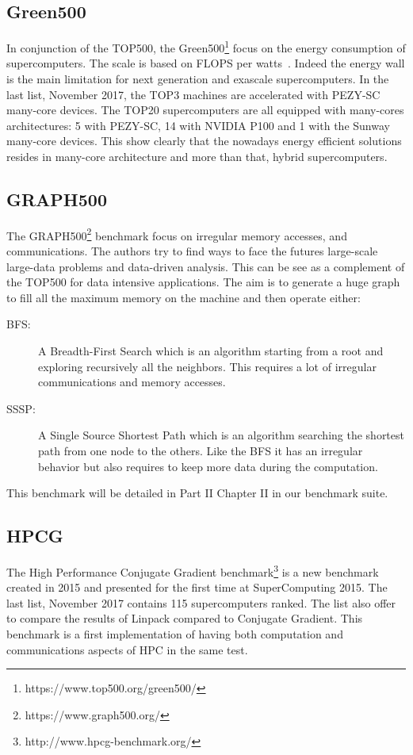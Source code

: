 \subsection{Green500}
In conjunction of the TOP500, the Green500\footnote{https://www.top500.org/green500/} focus on the energy consumption of supercomputers. 
The scale is based on FLOPS per watts~\cite{feng2007green500}.
Indeed the energy wall is the main limitation for next generation and exascale supercomputers. 
In the last list, November 2017, the TOP3 machines are accelerated with PEZY-SC many-core devices. 
The TOP20 supercomputers are all equipped with many-cores architectures: 5 with PEZY-SC, 14 with NVIDIA P100 and 1 with the Sunway many-core devices. 
This show clearly that the nowadays energy efficient solutions resides in many-core architecture and more than that, hybrid supercomputers. 

\subsection{GRAPH500}
The GRAPH500\footnote{https://www.graph500.org/} benchmark\cite{murphy2010introducing} focus on irregular memory accesses, and communications.
The authors try to find ways to face the futures large-scale large-data problems and data-driven analysis.
This can be see as a complement of the TOP500 for data intensive applications.
The aim is to generate a huge graph to fill all the maximum memory on the machine and then operate either:
\begin{description}
  \item[BFS:] A Breadth-First Search which is an algorithm starting from a root and exploring recursively all the neighbors. 
  This requires a lot of irregular communications and memory accesses. 
  \item[SSSP:] A Single Source Shortest Path which is an algorithm searching the shortest path from one node to the others. 
  Like the BFS it has an irregular behavior but also requires to keep more data during the computation.
\end{description}

This benchmark will be detailed in Part II Chapter II in our benchmark suite. 

\subsection{HPCG}
The High Performance Conjugate Gradient benchmark\footnote{http://www.hpcg-benchmark.org/} is a new benchmark created in 2015 and presented for the first time at SuperComputing 2015. 
The last list, November 2017 contains 115 supercomputers ranked. 
The list also offer to compare the results of Linpack compared to Conjugate Gradient. 
This benchmark is a first implementation of having both computation and 
communications aspects of HPC in the same test. 


